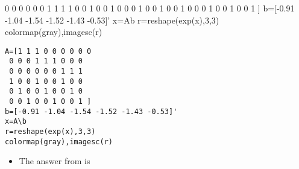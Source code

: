 \begin{example}
{{ 0 0 0 0 0 0 1 1 1
 1 0 0 1 0 0 1 0 0 
 0 1 0 0 1 0 0 1 0 
 0 0 1 0 0 1 0 0 1 ]
b=[-0.91 -1.04 -1.54 -1.52 -1.43 -0.53]'
x=A\slosh b
r=reshape(exp(x),3,3)
colormap(gray),imagesc(r)
}}%
\marginajrbox%
\begin{verbatim}
A=[1 1 1 0 0 0 0 0 0 
 0 0 0 1 1 1 0 0 0 
 0 0 0 0 0 0 1 1 1
 1 0 0 1 0 0 1 0 0 
 0 1 0 0 1 0 0 1 0 
 0 0 1 0 0 1 0 0 1 ]
b=[-0.91 -1.04 -1.54 -1.52 -1.43 -0.53]'
x=A\b
r=reshape(exp(x),3,3)
colormap(gray),imagesc(r)
\end{verbatim}
%
\def\temp#1#2#3#4#5#6#7#8#9{\begin{tikzpicture}
\begin{axis}[tiny,axis equal image,colormap/blackwhite,axis lines=none]
\addplot[patch,patch type=rectangle
,point meta min={0},point meta max={1}
,table/row sep=\\,patch table with point meta={%
8 9 13 12   #1\\
4 5 9 8     #2\\
0 1 5 4     #3\\
9 10 14 13  #4\\
5 6 10 9    #5\\
1 2 6 5     #6\\
10 11 15 14 #7\\
6 7 11 10   #8\\
2 3 7 6     #9\\
}]
table[row sep=\\] {
x y \\
0 0\\%
1 0\\%
2 0\\%
3 0\\%
0 1\\%
1 1\\%
2 1\\%
3 1\\%
0 2\\%
1 2\\%
2 2\\%
3 2\\%
0 3\\%
1 3\\%
2 3\\%
3 3\\%
};
\end{axis}
\end{tikzpicture}}%
\begin{itemize}
\item 
The answer from \script[2] is \twodp

\end{itemize}
\end{example}
